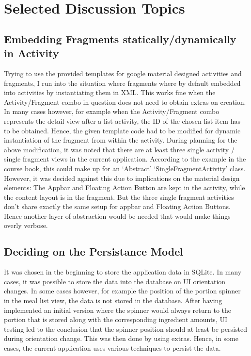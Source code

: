 \documentclass[a4paper,11pt,twoside]{article}
\begin{document}
\section{Selected Discussion Topics}

\subsection{Embedding Fragments statically/dynamically in Activity}
Trying to use the provided templates for google material designed activities and
fragments, I run into the situation where fragments where by default embedded into
activities by instantiating them in XML. This works fine when the Activity/Fragment
combo in question does not need to obtain extras on creation. In many cases however,
for example when the Activity/Fragment combo represents the detail view after a
list activity, the ID of the chosen list item has to be obtained. Hence, the given
template code had to be modified for dynamic instantiation of the fragment from
within the activity.
During planning for the above modification, it was noted that there are at least
three single activity / single fragment views in the current application. According
to the example in the course book, this could make up for an `Abstract'
`SingleFragmentActivity' class. However, it was decided against this due to
implications on the material design elements: The Appbar and Floating Action Button
are kept in the activity, while the content layout is in the fragment. But the
three single fragment activities don't share exactly the same setup for appbar
and Floating Action Buttons. Hence another layer of abstraction would be needed that
would make things overly verbose.

\subsection{Deciding on the Persistance Model} It was chosen in the beginning to
store the application data in SQLite. In many cases, it was possible to store
the data into the database on UI orientation changes. In some cases however, for
example the position of the portion spinner in the meal list view, the data is
not stored in the database. After having implemented an initial version where
the spinner would always return to the portion that is stored along with the
corresponding ingredient amounts, UI testing led to the conclusion that the spinner
position should at least be persisted during orientation change. This was then
done by using extras. Hence, in some cases, the current application uses various
techniques to persist the data.
\end{document}
